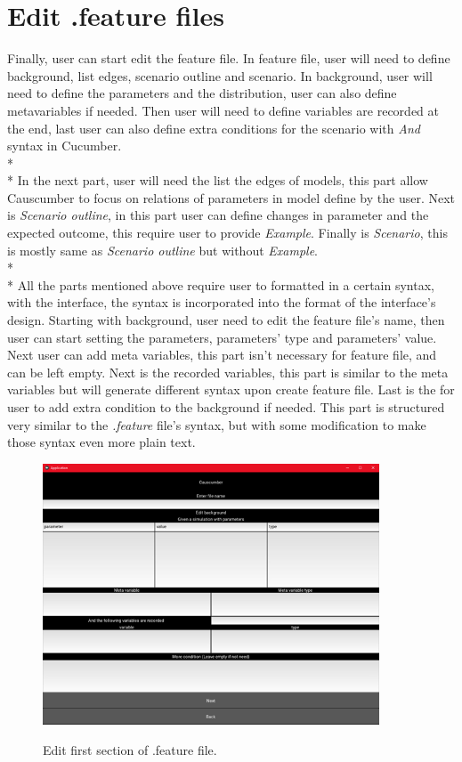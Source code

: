 \section{Edit .feature files}
Finally, user can start edit the feature file. In feature file, user will need to define background, list edges, scenario outline and scenario. In background, user will need to define the parameters and the distribution, user can also define metavariables if needed. Then user will need to define variables are recorded at the end, last user can also define extra conditions for the scenario with \textsl{And} syntax in Cucumber. \\*\\*
In the next part, user will need the list the edges of models, this part allow Causcumber to focus on relations of parameters in model define by the user. Next is \textsl{Scenario outline}, in this part user can define changes in parameter and the expected outcome, this require user to provide \textsl{Example}. Finally is \textsl{Scenario}, this is mostly same as \textsl{Scenario outline} but without  \textsl{Example}.\\*\\*
All the parts mentioned above require user to formatted in a certain syntax, with the interface, the syntax is incorporated into the format of the interface’s design. Starting with background, user need to edit the feature file’s name, then user can start setting the parameters, parameters’ type and parameters’ value. Next user can add meta variables, this part isn’t necessary for feature file, and can be left empty. Next is the recorded variables, this part is similar to the meta variables but will generate different syntax upon create feature file. Last is the for user to add extra condition to the background if needed. This part is structured very similar to the \textsl{.feature} file’s syntax, but with some modification to make those syntax even more plain text.
\begin{figure}[H]
	\centering
	\includegraphics[width=10cm]{figures/editFeature1Screen.png}\\
	\caption{Edit first section of .feature file.}
	\label{fig:figure16}
\end{figure}
